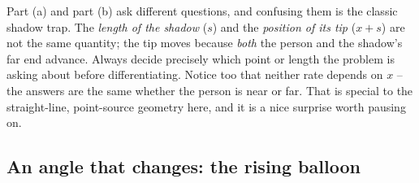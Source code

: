 \begin{trapbox}
Part (a) and part (b) ask different questions, and confusing them is the classic shadow trap. The
\emph{length of the shadow} ($s$) and the \emph{position of its tip} ($x+s$) are not the same
quantity; the tip moves because \emph{both} the person and the shadow's far end advance. Always
decide precisely which point or length the problem is asking about before differentiating. Notice
too that neither rate depends on $x$ -- the answers are the same whether the person is near or far.
That is special to the straight-line, point-source geometry here, and it is a nice surprise worth
pausing on.
\end{trapbox}

\subsection{An angle that changes: the rising balloon}

